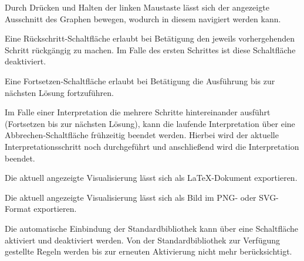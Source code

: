 \documentclass[parskip=full,11pt,twoside]{scrartcl}
\begin{document}

Durch Drücken und Halten der linken Maustaste lässt sich der angezeigte Ausschnitt des Graphen bewegen, wodurch in diesem navigiert werden kann.


Eine Rückschritt-Schaltfläche erlaubt bei Betätigung den jeweils vorhergehenden Schritt rückgängig zu machen. Im Falle des ersten Schrittes ist diese Schaltfläche deaktiviert.


Eine Fortsetzen-Schaltfläche erlaubt bei Betätigung die Ausführung bis zur nächsten Lösung fortzuführen.


Im Falle einer Interpretation die mehrere Schritte hintereinander ausführt (Fortsetzen bis zur nächsten Lösung), kann die laufende Interpretation über eine Abbrechen-Schaltfläche frühzeitig beendet werden. Hierbei wird der aktuelle Interpretationsschritt noch durchgeführt und anschließend wird die Interpretation beendet.


Die aktuell angezeigte Visualisierung lässt sich als LaTeX-Dokument exportieren.


Die aktuell angezeigte Visualisierung lässt sich als Bild im PNG- oder SVG-Format exportieren.


Die automatische Einbindung der Standardbibliothek kann über eine Schaltfläche aktiviert und deaktiviert werden. Von der Standardbibliothek zur Verfügung gestellte Regeln werden bis zur erneuten Aktivierung nicht mehr berücksichtigt.

\end{document}
